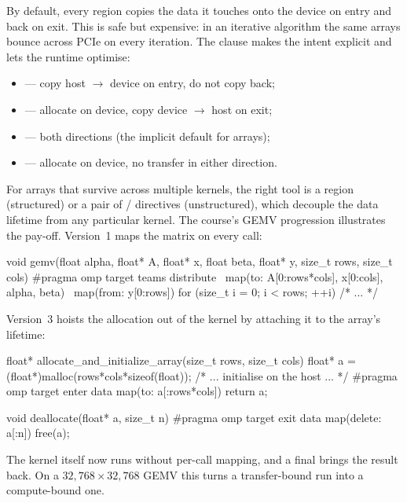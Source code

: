 By default, every  region copies the data it touches onto the device on entry and back on exit. This is safe but expensive: in an iterative algorithm the same arrays bounce across PCIe on every iteration. The  clause makes the intent explicit and lets the runtime optimise:

\begin{itemize}
    \item {} --- copy host $\to$ device on entry, do not copy back;
    \item {} --- allocate on device, copy device $\to$ host on exit;
    \item {} --- both directions (the implicit default for arrays);
    \item {} --- allocate on device, no transfer in either direction.
\end{itemize}

For arrays that survive across multiple kernels, the right tool is a  region (structured) or a pair of  /  directives (unstructured), which decouple the data lifetime from any particular kernel. The course's GEMV progression illustrates the pay-off. Version~1 maps the matrix on every call:

\begin{codeblock}[language=C]
void gemv(float alpha, float* A, float* x, float beta, float* y,
          size_t rows, size_t cols) {
    #pragma omp target teams distribute \
            map(to: A[0:rows*cols], x[0:cols], alpha, beta) \
            map(from: y[0:rows])
    for (size_t i = 0; i < rows; ++i) { /* ... */ }
}
\end{codeblock}

Version~3 hoists the allocation out of the kernel by attaching it to the array's lifetime:

\begin{codeblock}[language=C]
float* allocate_and_initialize_array(size_t rows, size_t cols) {
    float* a = (float*)malloc(rows*cols*sizeof(float));
    /* ... initialise on the host ... */
    #pragma omp target enter data map(to: a[:rows*cols])
    return a;
}

void deallocate(float* a, size_t n) {
    #pragma omp target exit data map(delete: a[:n])
    free(a);
}
\end{codeblock}

The kernel itself now runs without per-call mapping, and a final  brings the result back. On a $32{,}768 \times 32{,}768$ GEMV this turns a transfer-bound run into a compute-bound one.

